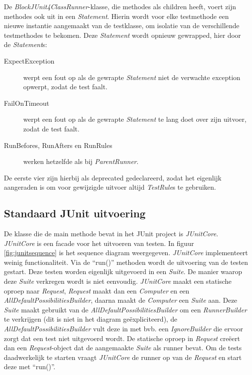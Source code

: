 \documentclass[i1]{oss}
\begin{document}
De \emph{BlockJUnit4ClassRunner}-klasse, die methodes als children heeft, voert zijn methodes ook uit in een \emph{Statement}. Hierin wordt voor elke testmethode een nieuwe instantie aangemaakt van de testklasse, om isolatie van de verschillende testmethodes te bekomen. Deze \emph{Statement} wordt opnieuw gewrapped, hier door de \emph{Statement}s:

\begin{description}
\item[ExpectException] werpt een fout op als de gewrapte \emph{Statement} niet de verwachte exception opwerpt, zodat de test faalt.
\item[FailOnTimeout] werpt een fout op als de gewrapte \emph{Statement} te lang doet over zijn uitvoer, zodat de test faalt.
\item[RunBefores, RunAfters en RunRules] werken hetzelfde als bij \emph{ParentRunner}.
\end{description}

De eerste vier zijn hierbij als deprecated gedeclareerd, zodat het eigenlijk aangeraden is om voor gewijzigde uitvoer altijd \emph{TestRule}s te gebruiken.

\subsection{}

\subsection{Standaard JUnit uitvoering}

De klasse die de main methode bevat in het JUnit project is \emph{JUnitCore}.
\emph{JUnitCore} is een facade voor het uitvoeren van testen.
In figuur \ref{fig:junitsequence} is het sequence diagram weergegeven.
\emph{JUnitCore} implementeert weinig functionaliteit.
Via de ``run()'' methoden wordt de uitvoering van de testen gestart.
Deze testen worden eigenlijk uitgevoerd in een \emph{Suite}.
De manier waarop deze \emph{Suite} verkregen wordt is niet eenvoudig.
\emph{JUnitCore} maakt een statische oproep naar \emph{Request},
\emph{Request} maakt dan een \emph{Computer} en een
\emph{AllDefaultPossibilitiesBuilder}, daarna maakt de \emph{Computer}
een \emph{Suite} aan.
Deze \emph{Suite} maakt gebruikt van de \emph{AllDefaultPossibilitiesBuilder}
om een \emph{RunnerBuilder} te verkrijgen (dit is niet in het diagram
ge\"expliciteerd), de \emph{AllDefaultPossibilitiesBuilder} vult deze in met
bvb. een \emph{IgnoreBuilder} die ervoor zorgt dat een test niet uitgevoerd
wordt.
De statische oproep in \emph{Request} cre\"eert dan een \emph{Request}-object
dat de aangemaakte \emph{Suite} als runner bevat.
Om de tests daadwerkelijk te starten vraagt \emph{JUnitCore} de runner op
van de \emph{Request} en start deze met ``run()''.
\end{document}
